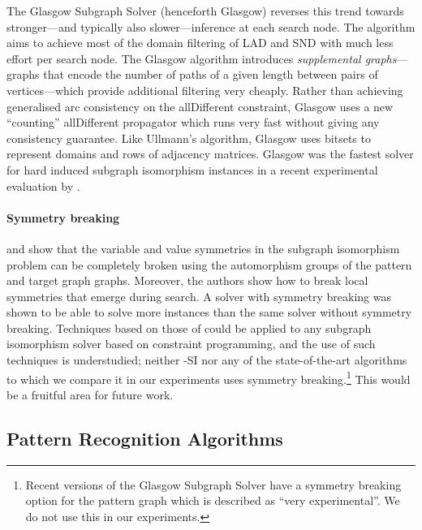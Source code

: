The Glasgow Subgraph Solver
\citep{DBLP:conf/cp/McCreeshP15,DBLP:conf/gg/McCreeshP020} (henceforth Glasgow)
reverses this trend towards stronger---and typically also slower---inference
at each search node.  The
algorithm aims to achieve most of the domain filtering of LAD and SND with much
less effort per search node.
The Glasgow algorithm introduces
\emph{supplemental graphs}---graphs that encode the number of paths
of a given length between pairs of vertices---which provide additional filtering
very cheaply.
Rather than achieving generalised arc consistency on the allDifferent
constraint, Glasgow uses a new ``counting'' allDifferent propagator which runs
very fast without giving any consistency guarantee.
Like Ullmann's algorithm, Glasgow uses bitsets to represent domains and rows
of adjacency matrices.
Glasgow was the fastest solver for hard induced
subgraph isomorphism instances in a recent experimental evaluation by
\citet{DBLP:conf/gbrpr/Solnon19}.

\paragraph*{Symmetry breaking}
\citet{zampelli2007symmetry} and \citet{DBLP:phd/basesearch/Zampelli08}
show that the variable and value symmetries
in the subgraph isomorphism problem can be completely broken using
the automorphism groups of the pattern and target graph graphs.
Moreover, the authors show how to break local symmetries that emerge
during search.
A solver with symmetry breaking was shown to be able to solve more instances
than the same solver without symmetry breaking. 
Techniques based on those of \citeauthor{zampelli2007symmetry} 
could be applied to any subgraph isomorphism solver based on constraint programming,
and the use of such techniques is understudied; neither \McSplit-SI nor any of
the state-of-the-art algorithms to which we compare it in our experiments
uses symmetry
breaking.\footnote{Recent versions of the Glasgow Subgraph Solver
have a symmetry breaking option for the pattern graph which is described as ``very experimental''.
We do not use this in our experiments.}  This would be a fruitful area for future
work.

\subsection{Pattern Recognition Algorithms}\label{subsec:pr-sip}

